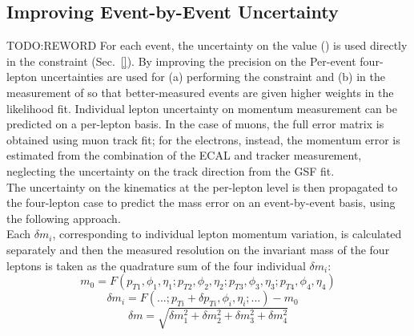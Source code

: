 \subsection{Improving Event-by-Event \mfourl Uncertainty}
\label{sec:ebe}
TODO:REWORD
For each event, the uncertainty on the \mfourl value (\mfourlerr) is used directly in the \Zone constraint (Sec.~\ref{}).
By improving the precision on the \mfourlerr 
Per-event four-lepton uncertainties are used for (a) performing the \Zone constraint and (b) in the measurement of \mH so that better-measured events are given higher weights in the likelihood fit.
Individual lepton uncertainty on momentum measurement can be predicted on a per-lepton 
basis. In the case of muons, the full error matrix is obtained using muon track fit; for the electrons,
instead, the momentum error is estimated from the combination of the ECAL and tracker measurement, 
neglecting the uncertainty on the track direction from the GSF fit. \\
The uncertainty on the kinematics at the per-lepton level is then propagated to the four-lepton case 
to predict the mass error on an event-by-event basis, using the following approach.\\
Each $\delta m_{i}$, corresponding to individual lepton momentum variation, is calculated separately 
and then the measured resolution on the invariant mass of the four leptons is taken as the quadrature sum 
of the four individual $\delta m_{i}$:
\[
m_{0} = F(p_{T1}, \phi_{1},\eta_{1}; p_{T2}, \phi_{2},\eta_{2}; p_{T3}, \phi_{3}, \eta_{3}; p_{T4}, \phi_{4},\eta_{4})
\]
\[\delta m_{i} = F(...; p_{Ti} + \delta p_{Ti}, \phi_{i}, \eta_{i}; ...) - m_{0} \quad
\]
\[
\delta m = \sqrt{\delta m_{1}^2 + \delta m_{2}^2 + \delta m_{3}^2 + \delta m_{4}^2}
\]

